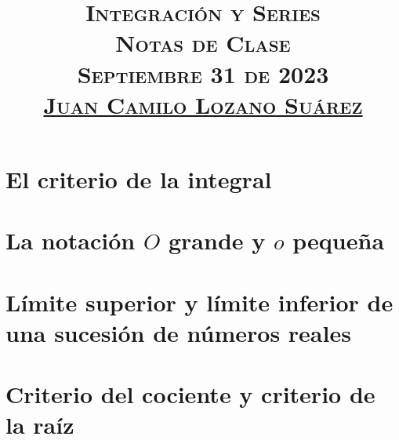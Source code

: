 \documentclass[letterpaper]{article} %
\title{
  \vspace{-1.5cm}
  \textsc{
    \Large{Integración y Series\\ Notas de Clase}\\ \vspace{0.2cm}
    \large{Septiembre 31 de 2023\\ \vspace{1cm} \underline{Juan Camilo Lozano Suárez}}\\
  }
}
\date{}
\begin{document}
  \maketitle
  \section{El criterio de la integral}
    
    
    
  \section{La notación $O$ grande y $o$ pequeña}
    
  \section{Límite superior y límite inferior de una sucesión de números reales}
    
  \section{Criterio del cociente y criterio de la raíz}
    
    
\end{document}
